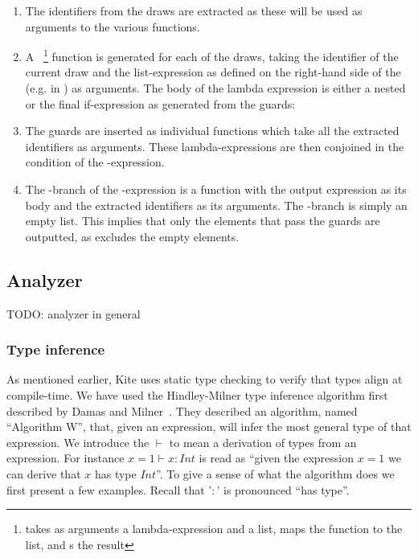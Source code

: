 \begin{enumerate}
\item The identifiers from the draws are extracted as these will be used as arguments to the various functions.

\item A ~\footnote{ takes as arguments a lambda-expression and a list, maps the function to the list, and s the result} function is generated for each of the draws, taking the identifier of the current draw and the list-expression as defined on the right-hand side of the \code{<-} (e.g. \code{[1, 2, 3]} in ) as arguments. The body of the lambda expression is either a nested  or the final if-expression as generated from the guards:

\item The guards are inserted as individual functions which take all the extracted identifiers as arguments. These lambda-expressions are then conjoined in the condition of the -expression.

\item The -branch of the -expression is a function with the output expression as its body and the extracted identifiers as its arguments. The -branch is simply an empty list. This implies that only the elements that pass the guards are outputted, as  excludes the empty elements.
\end{enumerate}


\subsection{Analyzer}
TODO: analyzer in general


\subsubsection{Type inference}
As mentioned earlier, Kite uses static type checking to verify that types align at compile-time. We have used the Hindley-Milner type inference algorithm first described by Damas and Milner~\cite{milner82}. They described an algorithm, named ``Algorithm W'', that, given an expression, will infer the most general type of that expression. We introduce the $\vdash$ to mean a derivation of types from an expression. For instance $x = 1 \vdash x : Int$ is read as ``given the expression $x = 1$ we can derive that $x$ has type $Int$''. To give a sense of what the algorithm does we first present a few examples. Recall that '$:$' is pronounced ``has type''.

